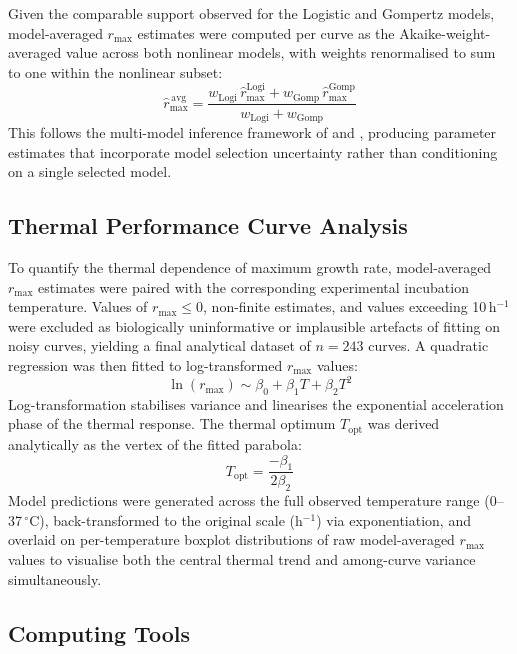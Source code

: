 \documentclass[11pt,a4paper]{article}
\begin{document}
Given the comparable support observed for the Logistic and Gompertz
models, model-averaged $r_{\max}$ estimates were computed per curve as
the Akaike-weight-averaged value across both nonlinear models, with
weights renormalised to sum to one within the nonlinear subset:
\begin{equation}
    \hat{r}_{\max}^{\,\text{avg}} =
    \frac{w_{\text{Logi}}\,\hat{r}_{\max}^{\text{Logi}} +
          w_{\text{Gomp}}\,\hat{r}_{\max}^{\text{Gomp}}}
         {w_{\text{Logi}} + w_{\text{Gomp}}}
\end{equation}
This follows the multi-model inference framework of \citet{burnham2002}
and \citet{Johnson2004}, producing parameter estimates that incorporate
model selection uncertainty rather than conditioning on a single selected
model.

\subsection{Thermal Performance Curve Analysis}

To quantify the thermal dependence of maximum growth rate,
model-averaged $r_{\max}$ estimates were paired with the corresponding
experimental incubation temperature. Values of $r_{\max} \leq 0$,
non-finite estimates, and values exceeding 10\,h$^{-1}$ were excluded
as biologically uninformative or implausible artefacts of fitting on
noisy curves, yielding a final analytical dataset of $n = 243$ curves. A
quadratic regression was then fitted to log-transformed $r_{\max}$
values:
\begin{equation}
    \ln(r_{\max}) \sim \beta_0 + \beta_1 T + \beta_2 T^2
\end{equation}
Log-transformation stabilises variance and linearises the exponential
acceleration phase of the thermal response. The thermal optimum
$T_{\text{opt}}$ was derived analytically as the vertex of the fitted
parabola:
\begin{equation}
    T_{\text{opt}} = \frac{-\beta_1}{2\beta_2}
\end{equation}
Model predictions were generated across the full observed temperature
range (0--37\,$^\circ$C), back-transformed to the original scale
(h$^{-1}$) via exponentiation, and overlaid on per-temperature boxplot
distributions of raw model-averaged $r_{\max}$ values to visualise both
the central thermal trend and among-curve variance simultaneously.

\subsection{Computing Tools}
\end{document}
